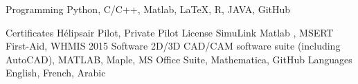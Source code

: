 

\begin{cvskills}

  \cvskill
    {Programming} %
    {Python, C/C++, Matlab, LaTeX, R, JAVA, GitHub} %

  \cvskill
    {Certificates} %
    {Hélipsair Pilot, Private Pilot License SimuLink Matlab , MSERT First-Aid, WHMIS 2015} %
\cvskill
    {Software} %
    {2D/3D CAD/CAM software suite (including AutoCAD), MATLAB, Maple, MS Office Suite, Mathematica, GitHub} %
  \cvskill
    {Languages} %
    {English, French, Arabic} %

\end{cvskills}
